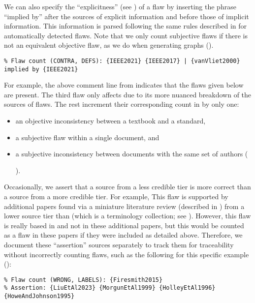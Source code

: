 We can also specify the ``explicitness'' (see ) of a flaw by inserting
the phrase ``implied by'' after the sources of explicit information and before
those of implicit information. This information is parsed following the same
rules described in  for automatically
detected flaws. Note that we only count subjective flaws if there is not an
equivalent objective flaw, as we do when generating graphs ().
\begin{displayquote}
    \texttt{\% Flaw count (CONTRA, DEFS): \{IEEE2021\} \{IEEE2017\} |
        \displayNL \{vanVliet2000\} implied by \{IEEE2021\}}
\end{displayquote}
For example, the above comment line\utd{} from  indicates
that the flaws given below are present. The third flaw only affects
 due to its more nuanced breakdown of the
sources of flaws. The rest increment their corresponding count in
 by only one:
\begin{itemize}
    \item an objective inconsistency between a textbook and a standard,
    \item a subjective flaw within a single document, and
    \item a subjective inconsistency between documents with the same set of
          authors (\begin{NoHyper}\citeauthor{IEEE2022}\end{NoHyper}).
\end{itemize}

\label{less-cred-assert}
Occasionally, we assert that a source from a less credible tier is more correct
than a source from a more credible tier.
For example, \tolTestFlaw*{} This flaw is supported
by additional papers found via a miniature literature review (described in
) from a lower source tier than \citep{Firesmith2015}
(which is a terminology collection; see ). However, this
flaw is really based in \citep{Firesmith2015} and not in these
additional papers, but this would be counted as a flaw in these papers if they
were included as detailed above. Therefore, we document these ``assertion''
sources separately to track them for traceability without incorrectly
counting flaws, such as the following for this specific example
():
\begin{displayquote}
    \texttt{\% Flaw count (WRONG, LABELS): \{Firesmith2015\}\\
        \% Assertion: \{LiuEtAl2023\} \{MorgunEtAl1999\} \{HolleyEtAl1996\}
        \displayNL \{HoweAndJohnson1995\}}
\end{displayquote}

